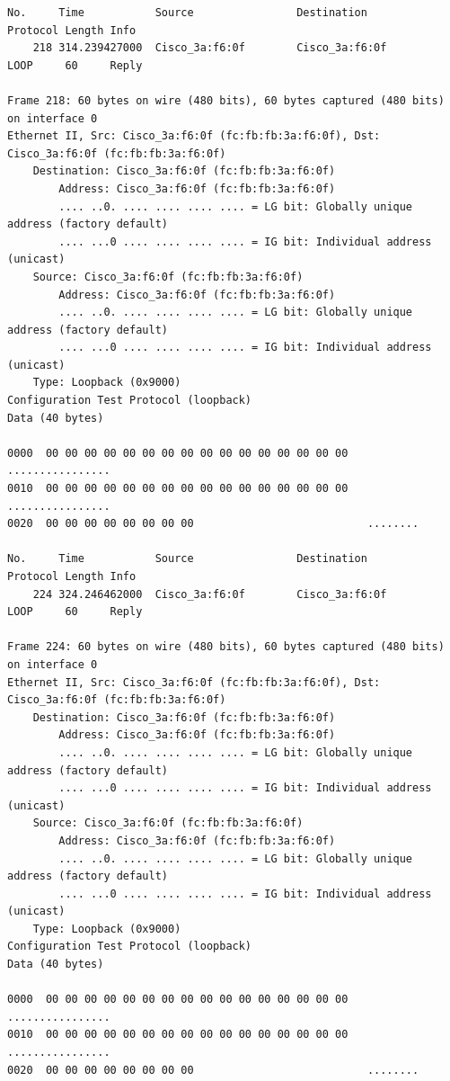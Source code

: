 \documentclass[a4paper,11pt]{article}
\begin{document}
\begin{lstlisting}
No.     Time           Source                Destination           Protocol Length Info
    218 314.239427000  Cisco_3a:f6:0f        Cisco_3a:f6:0f        LOOP     60     Reply

Frame 218: 60 bytes on wire (480 bits), 60 bytes captured (480 bits) on interface 0
Ethernet II, Src: Cisco_3a:f6:0f (fc:fb:fb:3a:f6:0f), Dst: Cisco_3a:f6:0f (fc:fb:fb:3a:f6:0f)
    Destination: Cisco_3a:f6:0f (fc:fb:fb:3a:f6:0f)
        Address: Cisco_3a:f6:0f (fc:fb:fb:3a:f6:0f)
        .... ..0. .... .... .... .... = LG bit: Globally unique address (factory default)
        .... ...0 .... .... .... .... = IG bit: Individual address (unicast)
    Source: Cisco_3a:f6:0f (fc:fb:fb:3a:f6:0f)
        Address: Cisco_3a:f6:0f (fc:fb:fb:3a:f6:0f)
        .... ..0. .... .... .... .... = LG bit: Globally unique address (factory default)
        .... ...0 .... .... .... .... = IG bit: Individual address (unicast)
    Type: Loopback (0x9000)
Configuration Test Protocol (loopback)
Data (40 bytes)

0000  00 00 00 00 00 00 00 00 00 00 00 00 00 00 00 00   ................
0010  00 00 00 00 00 00 00 00 00 00 00 00 00 00 00 00   ................
0020  00 00 00 00 00 00 00 00                           ........

No.     Time           Source                Destination           Protocol Length Info
    224 324.246462000  Cisco_3a:f6:0f        Cisco_3a:f6:0f        LOOP     60     Reply

Frame 224: 60 bytes on wire (480 bits), 60 bytes captured (480 bits) on interface 0
Ethernet II, Src: Cisco_3a:f6:0f (fc:fb:fb:3a:f6:0f), Dst: Cisco_3a:f6:0f (fc:fb:fb:3a:f6:0f)
    Destination: Cisco_3a:f6:0f (fc:fb:fb:3a:f6:0f)
        Address: Cisco_3a:f6:0f (fc:fb:fb:3a:f6:0f)
        .... ..0. .... .... .... .... = LG bit: Globally unique address (factory default)
        .... ...0 .... .... .... .... = IG bit: Individual address (unicast)
    Source: Cisco_3a:f6:0f (fc:fb:fb:3a:f6:0f)
        Address: Cisco_3a:f6:0f (fc:fb:fb:3a:f6:0f)
        .... ..0. .... .... .... .... = LG bit: Globally unique address (factory default)
        .... ...0 .... .... .... .... = IG bit: Individual address (unicast)
    Type: Loopback (0x9000)
Configuration Test Protocol (loopback)
Data (40 bytes)

0000  00 00 00 00 00 00 00 00 00 00 00 00 00 00 00 00   ................
0010  00 00 00 00 00 00 00 00 00 00 00 00 00 00 00 00   ................
0020  00 00 00 00 00 00 00 00                           ........


\end{lstlisting}
\end{document}
